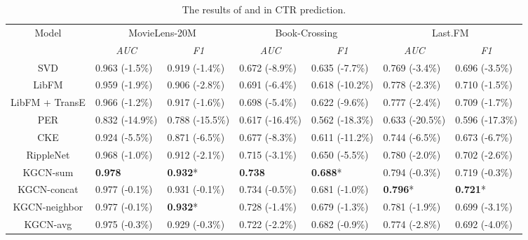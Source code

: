 \documentclass[sigconf]{acmart}
\begin{document}
	\begin{table*}[t]
    	\centering
    	\setlength{\tabcolsep}{8pt}
    	\caption{The results of  and  in CTR prediction.}
    	\begin{tabular}{c|llllll}
    		\hline
    		\multirow{2}{*}{Model} & \multicolumn{2}{c}{MovieLens-20M} & \multicolumn{2}{c}{Book-Crossing} & \multicolumn{2}{c}{Last.FM} \\
            & \multicolumn{1}{c}{\textit{AUC}} & \multicolumn{1}{c}{\textit{F1}} & \multicolumn{1}{c}{\textit{AUC}} & \multicolumn{1}{c}{\textit{F1}} & \multicolumn{1}{c}{\textit{AUC}} & \multicolumn{1}{c}{\textit{F1}} \\
            \hline
            SVD & 0.963 (-1.5\%) & 0.919 (-1.4\%) & 0.672 (-8.9\%) & 0.635 (-7.7\%) & 0.769 (-3.4\%) & 0.696 (-3.5\%) \\
            LibFM & 0.959 (-1.9\%) & 0.906 (-2.8\%) & 0.691 (-6.4\%) & 0.618 (-10.2\%) & 0.778 (-2.3\%) & 0.710 (-1.5\%) \\
            LibFM + TransE & 0.966 (-1.2\%) & 0.917 (-1.6\%) & 0.698 (-5.4\%) & 0.622 (-9.6\%) & 0.777 (-2.4\%) & 0.709 (-1.7\%) \\
            PER & 0.832 (-14.9\%) & 0.788 (-15.5\%) & 0.617 (-16.4\%) & 0.562 (-18.3\%) & 0.633 (-20.5\%) & 0.596 (-17.3\%) \\
            CKE & 0.924 (-5.5\%) & 0.871 (-6.5\%) & 0.677 (-8.3\%) & 0.611 (-11.2\%) & 0.744 (-6.5\%) & 0.673 (-6.7\%) \\
            RippleNet & 0.968 (-1.0\%) & 0.912 (-2.1\%) & 0.715 (-3.1\%) & 0.650 (-5.5\%) & 0.780 (-2.0\%) & 0.702 (-2.6\%) \\
            \hline
            KGCN-sum & \textbf{0.978} & \textbf{0.932}* & \textbf{0.738} & \textbf{0.688}* & 0.794 (-0.3\%) & 0.719 (-0.3\%) \\
            KGCN-concat & 0.977 (-0.1\%) & 0.931 (-0.1\%) & 0.734 (-0.5\%) & 0.681 (-1.0\%) & \textbf{0.796}* & \textbf{0.721}* \\
            KGCN-neighbor & 0.977 (-0.1\%) & \textbf{0.932}* & 0.728 (-1.4\%) & 0.679 (-1.3\%) & 0.781 (-1.9\%) & 0.699 (-3.1\%) \\
            \hline
            KGCN-avg & 0.975 (-0.3\%) & 0.929 (-0.3\%) & 0.722 (-2.2\%) & 0.682 (-0.9\%) & 0.774 (-2.8\%) & 0.692 (-4.0\%) \\
            \hline
		\end{tabular}
		\label{table:ctr}
		\footnotesize {}
	\end{table*}
		
\end{document}
